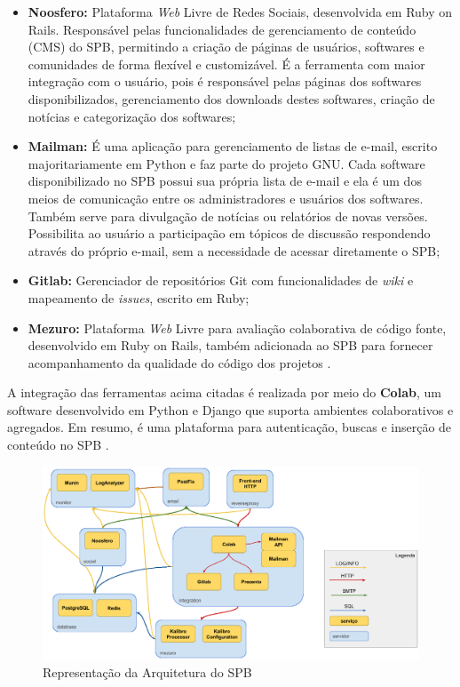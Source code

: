 \begin{itemize}
  \item \textbf{Noosfero:} Plataforma \textit{Web} Livre de Redes Sociais, desenvolvida
	em Ruby on Rails. Responsável pelas funcionalidades de gerenciamento de
	conteúdo (CMS) do SPB, permitindo a criação de páginas de usuários, softwares
	e comunidades de forma flexível e customizável. É a ferramenta com maior
	integração com o usuário, pois é responsável pelas páginas dos softwares
	disponibilizados, gerenciamento dos downloads destes softwares, criação de
	notícias e categorização dos softwares;
  \item \textbf{Mailman:} É uma aplicação para gerenciamento de listas de
	e-mail, escrito majoritariamente em Python e faz parte do projeto GNU. Cada
	software disponibilizado no SPB possui sua própria lista de e-mail e ela é um
	dos meios de comunicação entre os administradores e usuários dos softwares.
	Também serve para divulgação de notícias ou relatórios de novas versões.
	Possibilita ao usuário a participação em tópicos de discussão respondendo
	através do próprio e-mail, sem a necessidade de acessar diretamente o SPB;
	\item \textbf{Gitlab:} Gerenciador de repositórios Git com funcionalidades de
	\textit{wiki} e mapeamento de \textit{issues}, escrito em Ruby;
	\item \textbf{Mezuro:} Plataforma \textit{Web} Livre para avaliação colaborativa de
	código fonte, desenvolvido em Ruby on Rails, também adicionada ao SPB para
	fornecer acompanhamento da qualidade do código dos projetos \cite{aboutSPB}.
\end{itemize}

A integração das ferramentas acima citadas é realizada por meio do
\textbf{Colab}, um software desenvolvido em Python e Django que suporta
ambientes colaborativos e agregados. Em resumo, é uma plataforma para
autenticação, buscas e inserção de conteúdo no SPB \cite{aboutSPB}.

\begin{figure}[!htb]
	\centering
    \includegraphics[keepaspectratio=true,scale=0.3]
    {figuras/arquitetura_spb.eps}
  \caption{Representação da Arquitetura do SPB}
  \label{fig:arquitetura_spb}
\end{figure}

